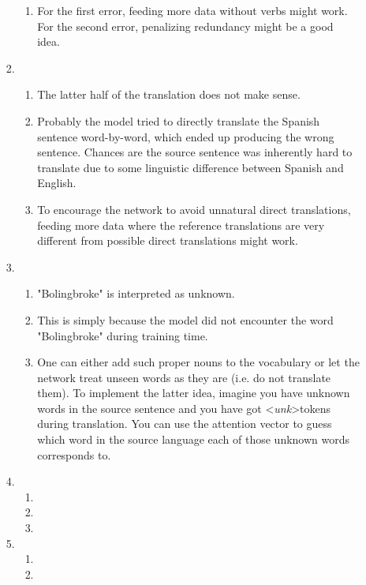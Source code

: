 \documentclass[12pt]{article}
\begin{document}
\begin{enumerate}[label=\textbf{\arabic*.}]
\begin{enumerate}[label=(\alph*)]
\begin{enumerate}[label=\roman*.]
\begin{enumerate}[label=\arabic*.]
        \item For the first error, feeding more data without verbs might work. For the second error, penalizing redundancy might be a good idea.
      \end{enumerate}
      \item
      \begin{enumerate}[label=\arabic*.]
        \item The latter half of the translation does not make sense.
        \item Probably the model tried to directly translate the Spanish sentence word-by-word, which ended up producing the wrong sentence. Chances are the source sentence was inherently hard to translate due to some linguistic difference between Spanish and English.
        \item To encourage the network to avoid unnatural direct translations, feeding more data where the reference translations are very different from possible direct translations might work.
      \end{enumerate}
      \item
      \begin{enumerate}[label=\arabic*.]
        \item "Bolingbroke" is interpreted as unknown.
        \item This is simply because the model did not encounter the word "Bolingbroke" during training time.
        \item One can either add such proper nouns to the vocabulary or let the network treat unseen words as they are (i.e. do not translate them). To implement the latter idea, imagine you have unknown words in the source sentence and you have got \textless\textit{unk}\textgreater tokens during translation. You can use the attention vector to guess which word in the source language each of those unknown words corresponds to.
      \end{enumerate}
      \item
      \begin{enumerate}[label=\arabic*.]
        \item
        \item
        \item
      \end{enumerate}
      \item
      \begin{enumerate}[label=\arabic*.]
        \item
        \item

\end{enumerate}
\end{enumerate}
\end{enumerate}
\end{enumerate}
\end{document}
